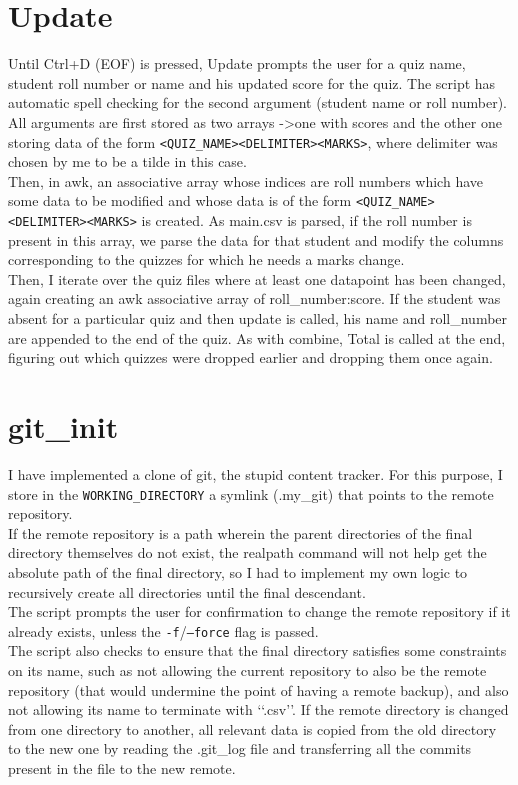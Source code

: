 \documentclass{article}
\begin{document}
    \section{Update}
    Until Ctrl+D (EOF) is pressed, Update prompts the user for a quiz name, student roll number or name and his updated score for the quiz.
    The script has automatic spell checking for the second argument (student name or roll number). All arguments are first stored as two arrays -\textgreater one with scores and the other one storing data of the form \texttt{\textless QUIZ\_NAME\textgreater\textless DELIMITER\textgreater\textless MARKS\textgreater}, where delimiter was chosen by me to be a tilde in this case.\\
    Then, in awk, an associative array whose indices are roll numbers which have some data to be modified and whose data is of the form \texttt{\textless QUIZ\_NAME\textgreater\textless DELIMITER\textgreater\textless MARKS\textgreater} is created. As main.csv is parsed, if the roll number is present in this array, we parse the data for that student and modify the columns corresponding to the quizzes for which he needs a marks change.\\
    Then, I iterate over the quiz files where at least one datapoint has been changed, again creating an awk associative array of roll\_number:score. If the student was absent for a particular quiz and then update is called, his name and roll\_number are appended to the end of the quiz.
    As with combine, Total is called at the end, figuring out which quizzes were dropped earlier and dropping them once again.

    \section{git\_init}
    I have implemented a clone of git, the stupid content tracker. For this purpose, I store in the \texttt{WORKING\_DIRECTORY} a symlink (.my\_git) that points to the remote repository.\\
    If the remote repository is a path wherein the parent directories of the final directory themselves do not exist, the realpath command will not help get the absolute path of the final directory, so I had to implement my own logic to recursively create all directories until the final descendant.\\
    The script prompts the user for confirmation to change the remote repository if it already exists, unless the \texttt{-f}/\texttt{--force} flag is passed.\\
    The script also checks to ensure that the final directory satisfies some constraints on its name, such as not allowing the current repository to also be the remote repository (that would undermine the point of having a remote backup), and also not allowing its name to terminate with \lq\lq.csv\rq\rq.
    If the remote directory is changed from one directory to another, all relevant data is copied from the old directory to the new one by reading the .git\_log file and transferring all the commits present in the file to the new remote.
\end{document}
